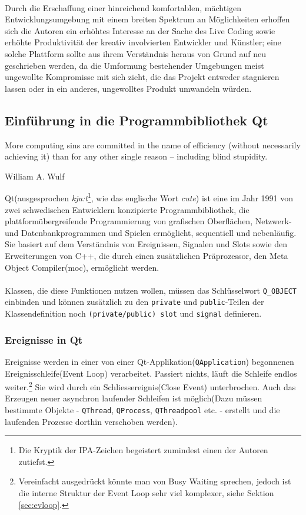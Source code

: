 \paragraph{}
	Durch die Erschaffung einer hinreichend komfortablen, mächtigen Entwicklungsumgebung mit einem breiten Spektrum an Möglichkeiten erhoffen sich 
	die Autoren ein erhöhtes Interesse an der Sache des Live Coding sowie erhöhte Produktivität der kreativ involvierten Entwickler und Künstler; eine
	solche Plattform sollte aus ihrem Verständnis heraus von Grund auf neu geschrieben werden, da die Umformung bestehender Umgebungen meist
	ungewollte Kompromisse mit sich zieht, die das Projekt entweder stagnieren lassen oder in ein anderes, ungewolltes Produkt umwandeln würden.

\newpage

\subsection{Einführung in die Programmbibliothek Qt} \label{sec:Qt}
\epigraph{More computing sins are committed in the name of efficiency (without necessarily achieving it) than for any other single reason – including blind stupidity.}
{William A. Wulf}
	Qt(ausgesprochen \textit{kju:t}\footnote{Die Kryptik der IPA-Zeichen begeistert zumindest einen der Autoren zutiefst.}, wie das englische Wort 
	\textit{cute}) ist eine im Jahr 1991 von zwei schwedischen Entwicklern konzipierte Programmbibliothek, die plattformübergreifende Programmierung 
	von grafischen Oberflächen, Netzwerk- und Datenbankprogrammen und Spielen ermöglicht, sequentiell und nebenläufig. Sie basiert auf dem Verständnis 
    von Ereignissen, Signalen und Slots sowie den Erweiterungen von C++, die durch einen zusätzlichen Präprozessor, den Meta Object Compiler(moc),
	ermöglicht werden. 
\paragraph{}
	Klassen, die diese Funktionen nutzen wollen, müssen das Schlüsselwort \linebreak\texttt{Q\_OBJECT} einbinden und können zusätzlich zu den 
	\texttt{private} und \texttt{public}-Teilen der Klassendefinition noch \texttt{(private/public) slot} und \texttt{signal} definieren.
\subsubsection{Ereignisse in Qt}
	Ereignisse werden in einer von einer Qt-Applikation(\texttt{QApplication}) begonnenen Ereignisschleife(Event Loop) verarbeitet. Passiert nichts, läuft die 
	Schleife endlos weiter.\footnote{Vereinfacht ausgedrückt könnte man von Busy Waiting sprechen, jedoch ist die interne Struktur der Event Loop sehr viel
	komplexer, siehe Sektion \ref{sec:evloop}.} Sie wird durch ein Schliessereignis(Close Event) unterbrochen. Auch das Erzeugen neuer asynchron 
	laufender Schleifen ist möglich(Dazu müssen bestimmte Objekte - \texttt{QThread}, \texttt{QProcess}, \texttt{QThreadpool} etc. - erstellt und die 
    laufenden Prozesse dorthin verschoben werden).
